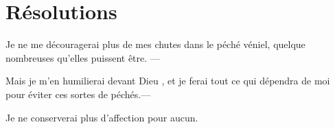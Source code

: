 \documentclass[instructions.tex]{subfiles}
\begin{document}
\section{Résolutions}
 
\primo Je ne me découragerai plus de mes chutes dans le péché véniel, quelque nombreuses qu’elles puissent être. —

\secundo Mais je m’en humilierai devant Dieu , et je ferai tout ce qui dépendra de moi pour éviter ces sortes de péchés.—

\tertio Je ne conserverai plus d’affection pour aucun. 

 
\end{document}
